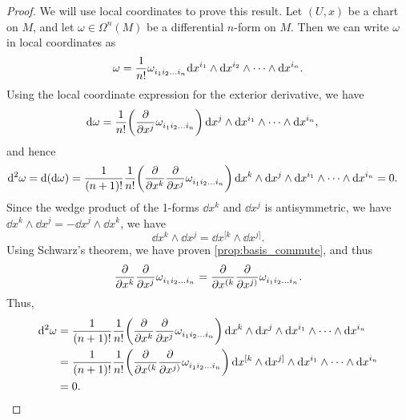 \begin{proof}
    We will use local coordinates to prove this result. Let \((U, x)\) be a chart on \(M\), and let \(\omega \in \Omega^n(M)\) be a differential \(n\)-form on \(M\). Then we can write \(\omega\) in local coordinates as
    \begin{equation*}
        \omega = \frac{1}{n!} \tensor{\omega}{_{i_1}_{i_2}_{\ldots}_{i_n}} \dd x^{i_1} \wedge \dd x^{i_2} \wedge \cdots \wedge \dd x^{i_n}.
    \end{equation*}
    Using the local coordinate expression for the exterior derivative, we have
    \begin{align*}
        \dd \omega & = \frac{1}{n!} \qty(\pdv{x^j} \tensor{\omega}{_{i_1}_{i_2}_{\ldots}_{i_n}}) \dd{x^j} \wedge \dd x^{i_1} \wedge \cdots \wedge \dd x^{i_n},
    \end{align*}
    and hence
    \begin{align*}
        \dd[2] \omega & = \dd(\dd \omega) = \frac{1}{(n+1)!} \frac{1}{n!} \qty(\pdv{x^k} \pdv{x^j} \tensor{\omega}{_{i_1}_{i_2}_{\ldots}_{i_n}}) \dd{x^k} \wedge \dd{x^j} \wedge \dd x^{i_1} \wedge \cdots \wedge \dd x^{i_n} = 0.
    \end{align*}
    Since the wedge product of the 1-forms \(\dd{x^k}\) and \(\dd{x^j}\) is antisymmetric, we have \(\dd{x^k} \wedge \dd{x^j} = -\dd{x^j} \wedge \dd{x^k}\), we have
    \begin{equation*}
        \dd{x^k} \wedge \dd{x^j} = \dd{x^{[k}} \wedge \dd{x^{j]}}.
    \end{equation*}
    Using Schwarz's theorem, we have proven \cref{prop:basis_commute}, and thus
    \begin{equation*}
        \pdv{x^k} \pdv{x^j} \tensor{\omega}{_{i_1}_{i_2}_{\ldots}_{i_n}} = \pdv{x^{(k}} \pdv{x^{j)}} \tensor{\omega}{_{i_1}_{i_2}_{\ldots}_{i_n}}.
    \end{equation*}
    Thus,
    \begin{align*}
        \dd[2] \omega & = \frac{1}{(n+1)!} \frac{1}{n!} \qty(\pdv{x^{k}} \pdv{x^{j}} \tensor{\omega}{_{i_1}_{i_2}_{\ldots}_{i_n}}) \dd{x^{k}} \wedge \dd{x^{j}} \wedge \dd x^{i_1} \wedge \cdots \wedge \dd x^{i_n}     \\
                      & = \frac{1}{(n+1)!} \frac{1}{n!} \qty(\pdv{x^{(k}} \pdv{x^{j)}} \tensor{\omega}{_{i_1}_{i_2}_{\ldots}_{i_n}}) \dd{x^{[k}} \wedge \dd{x^{j]}} \wedge \dd x^{i_1} \wedge \cdots \wedge \dd x^{i_n} \\
                      & = 0.
    \end{align*}
\end{proof}
